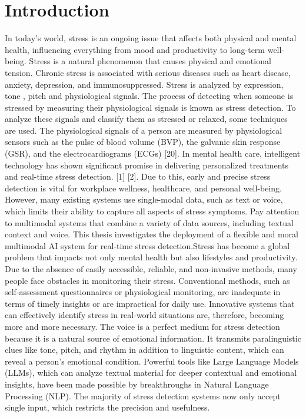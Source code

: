 \documentclass[a4j]{article}
\begin{document}
\section{Introduction}
In today's world, stress is an ongoing issue that affects both physical and mental health, influencing everything from mood and productivity to long-term well-being. Stress is a natural phenomenon that causes physical and emotional tension. Chronic stress is associated with serious diseases such as heart disease, anxiety, depression, and immunosuppressed. Stress is analyzed by expression, tone , pitch and physiological signals. The process of detecting when someone is stressed by measuring their physiological signals is known as stress detection. To analyze these signals and classify them as stressed or relaxed, some techniques are used. The physiological signals of a person are measured by physiological sensors such as the pulse of blood volume (BVP), the galvanic skin response (GSR), and the electrocardiograms (ECGs) [20]. In mental health care, intelligent technology has shown significant promise in delivering personalized treatments and real-time stress detection. [1] [2].  Due to this, early and precise stress detection is vital for workplace wellness, healthcare, and personal well-being. However, many existing systems use single-modal data, such as text or voice, which limits their ability to capture all aspects of stress symptoms. Pay attention to multimodal systems that combine a variety of data sources, including textual context and voice. This thesis investigates the deployment of a flexible and moral multimodal AI system for real-time stress detection.Stress has become a global problem that impacts not only mental health but also lifestyles and productivity. Due to the absence of easily accessible, reliable, and non-invasive methods, many people face obstacles in monitoring their stress. Conventional methods, such as self-assessment questionnaires or physiological monitoring, are inadequate in terms of timely insights or are impractical for daily use. Innovative systems that can effectively identify stress in real-world situations are, therefore, becoming more and more necessary.
The voice is a perfect medium for stress detection because it is a natural source of emotional information. It transmits paralinguistic clues like tone, pitch, and rhythm in addition to linguistic content, which can reveal a person's emotional condition. Powerful tools like Large Language Models (LLMs), which can analyze textual material for deeper contextual and emotional insights, have been made possible by breakthroughs in Natural Language Processing (NLP). The majority of stress detection systems now only accept single input, which restricts the precision and usefulness. 
\end{document}
